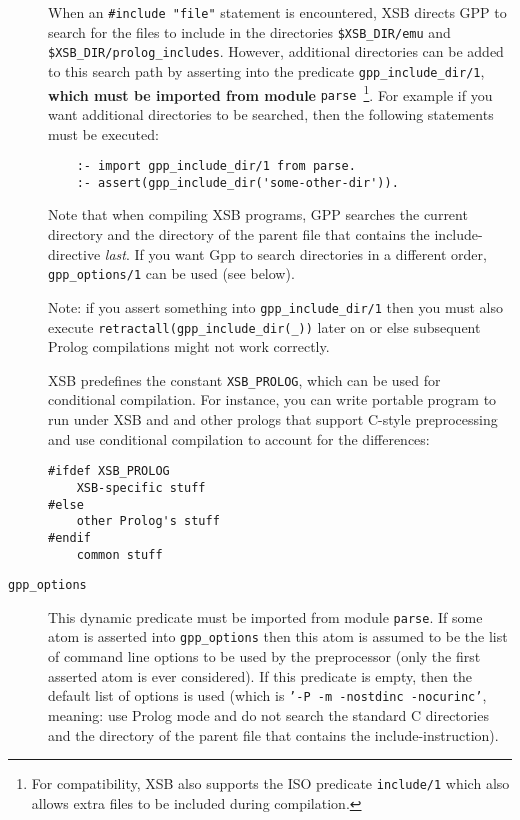 \begin{description}
  When an \verb|#include "file"| statement is encountered, XSB directs
  GPP to search for the files to include in the
  directories \verb|$XSB_DIR/emu| and
  \verb|$XSB_DIR/prolog_includes|. 
  However, additional directories can be added to this search path by
  asserting into the predicate \verb|gpp_include_dir/1|, {\bf which
    must be imported from module} {\tt parse}~\footnote{For
    compatibility, XSB also supports the ISO predicate {\tt include/1}
    which also allows extra files to be included during compilation.}.
%  
  For example if you want additional directories to be searched, then
  the following statements must be executed:
\begin{verbatim}
    :- import gpp_include_dir/1 from parse.
    :- assert(gpp_include_dir('some-other-dir')).
\end{verbatim}

  Note that when compiling XSB programs, GPP searches the current
  directory and the directory of the parent file that contains the
  include-directive \emph{last}. 
  If you want Gpp to search directories in a different order,
  {\tt gpp\_options/1} can be used (see below).

  Note: if you assert something into \texttt{gpp\_include\_dir/1} then you
  must also execute {\tt retractall(gpp\_include\_dir(\_))} later on or
  else subsequent Prolog compilations might not work correctly.

  XSB predefines the constant {\tt XSB\_PROLOG}, which can be used for
  conditional compilation. For instance, you can write portable program
  to run under XSB and and other prologs that support C-style
  preprocessing and use conditional compilation to account for the
  differences: 
  \begin{samepage}
  \begin{verbatim}
#ifdef XSB_PROLOG
    XSB-specific stuff
#else
    other Prolog's stuff
#endif
    common stuff
  \end{verbatim}
  \end{samepage}

\item[{\tt gpp\_options}]  This dynamic predicate
  must be imported from module {\tt parse}.  If some atom is asserted into
  {\tt gpp\_options} then this atom is assumed to be the list of command
  line options to be used by the preprocessor (only the first asserted atom
  is ever considered). If this predicate is empty, then the default list of
  options is used (which is {\tt '-P -m -nostdinc -nocurinc'}, meaning: use
  Prolog mode and do not search the standard C directories and the
  directory of the parent file that contains the include-instruction).
  

\end{description}
